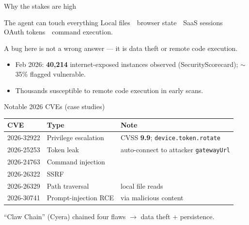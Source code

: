 \documentclass[aspectratio=169,11pt]{beamer}
\begin{document}
\begin{frame}{Why the stakes are high}
  \begin{block}{The agent can touch everything}
    Local files \,\textbullet\, browser state \,\textbullet\, SaaS sessions \,\textbullet\, OAuth tokens \,\textbullet\, command execution.
  \end{block}
  \vspace{0.6em}
  A bug here is not a wrong answer — it is \alert{data theft or remote code execution}.
  \vspace{0.8em}
  \begin{itemize}
    \item Feb 2026: \textbf{40{,}214} internet-exposed instances observed (SecurityScorecard); $\sim$35\% flagged vulnerable.
    \item Thousands susceptible to remote code execution in early scans.
  \end{itemize}
\end{frame}

\begin{frame}{Notable 2026 CVEs (case studies)}
  \centering
  \renewcommand{\arraystretch}{1.25}
  \begin{tabular}{l l l}
    \toprule
    \textbf{CVE} & \textbf{Type} & \textbf{Note} \\
    \midrule
    2026-32922 & Privilege escalation & CVSS \textbf{9.9}; \texttt{device.token.rotate} \\
    2026-25253 & Token leak & auto-connect to attacker \texttt{gatewayUrl} \\
    2026-24763 & Command injection & \\
    2026-26322 & SSRF & \\
    2026-26329 & Path traversal & local file reads \\
    2026-30741 & Prompt-injection RCE & via malicious content \\
    \bottomrule
  \end{tabular}
  \vspace{0.8em}
  \begin{center}\scriptsize ``Claw Chain'' (Cyera) chained four flaws $\to$ data theft + persistence.\end{center}
\end{frame}
\end{document}
